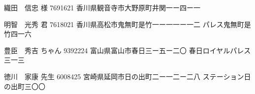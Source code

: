 \documentclass[]{jletteraddress}
\begin{document}
\addaddress
  {織田　信忠} {様}    
  {7691621}
  {香川県観音寺市大野原町井関一ー四ー一}    
  {}

\addaddress
  {明智　光秀} {君}    
  {7618021}
  {香川県高松市鬼無町是竹一ー一一ー一二}    
  {パレス鬼無町是竹四一六}

\addaddress
  {豊臣　秀吉} {ちゃん}  
  {9392224}
  {富山県富山市春日三ー五ー二〇}            
  {春日ロイヤルパレス三一三}

\addaddress
  {徳川　家康} {先生}    
  {6008425}
  {宮崎県延岡市日の出町二ー一二ー二八}      
  {ステーション日の出町三〇〇}
\end{document}
